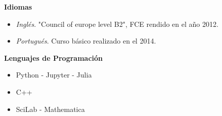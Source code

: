 \textbf{Idiomas}

\begin{itemize}
    \item \textit{Inglés}. "Council of europe level B2", FCE rendido en el año 2012.
    \item \textit{Portugués}. Curso básico realizado en el 2014.
\end{itemize}

\textbf{Lenguajes de Programación}

\begin{itemize}
    \item Python - Jupyter - Julia
    \item C++
    \item SciLab - Mathematica
\end{itemize}